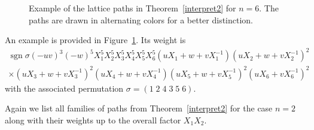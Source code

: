 \documentclass[12pt]{amsart}
\theoremstyle{definition}
\numberwithin{equation}{section}
\DeclareMathOperator{\sgn}{sgn}
\begin{document}
\begin{figure}[htb]
	
	\caption{Example of the lattice paths in Theorem~\ref{interpret2} for $n=6$. The paths are drawn in alternating colors for a better distinction.}
	\label{fig:ExampleSecondInterpretation}
\end{figure}

An example is provided in Figure~\ref{fig:ExampleSecondInterpretation}. Its weight is 
\begin{multline*}
	\sgn \sigma (-u v)^3 (-w)^5  X_1^5 X_2^5 X_3^5 X_4^5 X_5^5 X_6^5 (u X_1+ w+ v X_1^{-1}) (u X_2+ w+ v X_2^{-1})^2\\
	\times (u X_3+ w+ v X_3^{-1})^2 (u X_4+ w+ v X_4^{-1}) (u X_5+ w+ v X_5^{-1})^2 (u X_6 + v X_6^{-1})^2
\end{multline*}
with the associated permutation $\sigma = (1\;2\;4\;3\;5\;6)$.

Again we list all families of paths from Theorem~\ref{interpret2} for the case $n=2$ along with their weights up to the overall factor $X_1 X_2$.
\end{document}
